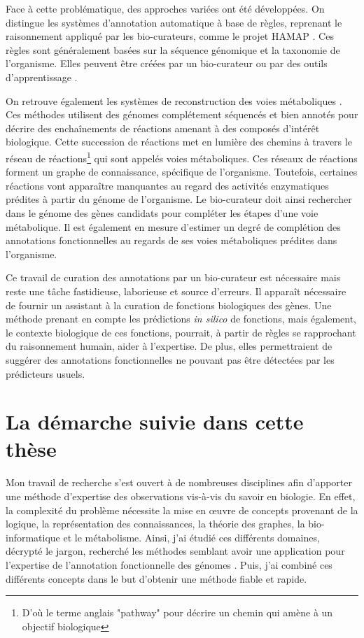 \begin{refsegment}
Face à cette problématique, des approches variées ont été développées. On distingue les systèmes d'annotation automatique à base de règles, reprenant le raisonnement appliqué par les bio-curateurs, comme le projet \gls{HAMAP} \cite{lima2009hamap}. Ces règles sont généralement basées sur la séquence génomique et la taxonomie de l'organisme. Elles peuvent être créées par un bio-curateur ou par des outils d'apprentissage \cite{uniprot2011ongoing}.

On retrouve également les systèmes de reconstruction des voies métaboliques \cite{karpe2011pathway}. Ces méthodes utilisent des génomes complétement séquencés et bien annotés pour décrire des enchaînements de réactions amenant à des composés d'intérêt biologique.  Cette succession de réactions met en lumière des chemins à travers le réseau de réactions\footnote{D'où le terme anglais "pathway" pour décrire un chemin qui amène à un objectif biologique} qui sont appelés voies métaboliques. Ces réseaux de réactions forment un graphe de connaissance, spécifique de l'organisme. Toutefois, certaines réactions vont apparaître manquantes au regard des activités enzymatiques prédites à partir du génome de l'organisme. Le bio-curateur doit ainsi rechercher dans le génome des gènes candidats pour compléter les étapes d'une voie métabolique. Il est également en mesure d'estimer un degré de complétion des annotations fonctionnelles au regards de ses voies métaboliques prédites dans l'organisme.

Ce travail de curation des annotations par un bio-curateur est nécessaire mais reste une tâche fastidieuse, laborieuse et source d’erreurs. Il apparaît nécessaire de fournir un assistant à la curation de fonctions biologiques des gènes. Une méthode prenant en compte les prédictions \textit{in silico} de fonctions, mais également, le contexte biologique de ces fonctions, pourrait, à partir de règles se rapprochant du raisonnement humain, aider à l’expertise. De plus, elles permettraient de suggérer des annotations fonctionnelles ne pouvant pas être détectées par les prédicteurs usuels. 

\section*{La démarche suivie dans cette thèse}

Mon travail de recherche s'est ouvert à de nombreuses disciplines afin d'apporter une méthode d'expertise des observations vis-à-vis du savoir en biologie. En effet, la complexité du problème nécessite la mise en œuvre de concepts provenant de la logique, la représentation des connaissances, la théorie des graphes, la bio-informatique et le métabolisme. Ainsi, j'ai étudié ces différents domaines, décrypté le jargon, recherché les méthodes semblant avoir une application pour l'expertise de l'annotation fonctionnelle des génomes . Puis, j'ai combiné ces différents concepts dans le but d'obtenir une méthode fiable et rapide.


\end{refsegment}
